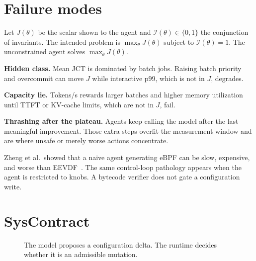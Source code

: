 \documentclass{article}
\begin{document}
\section{Failure modes}

Let $J(\theta)$ be the scalar shown to the agent and $\mathcal{I}(\theta)\in\{0,1\}$ the conjunction of invariants.
The intended problem is $\max_\theta J(\theta)$ subject to $\mathcal{I}(\theta)=1$.
The unconstrained agent solves $\max_\theta J(\theta)$.

\textbf{Hidden class.}
Mean JCT is dominated by batch jobs.
Raising batch priority and overcommit can move $J$ while interactive p99, which is not in $J$, degrades.

\textbf{Capacity lie.}
Tokens/s rewards larger batches and higher memory utilization until TTFT or KV-cache limits, which are not in $J$, fail.

\textbf{Thrashing after the plateau.}
Agents keep calling the model after the last meaningful improvement.
Those extra steps overfit the measurement window and are where unsafe or merely worse actions concentrate.

Zheng et al.\ showed that a naive agent generating eBPF can be slow, expensive, and worse than EEVDF~\cite{zheng2025schedcp}.
The same control-loop pathology appears when the agent is restricted to knobs.
A bytecode verifier does not gate a configuration write.

\section{SysContract}

\begin{figure}[ht]
\centering
{}
\caption{The model proposes a configuration delta. The runtime decides whether it is an admissible mutation.}
\label{fig:arch}
\end{figure}
\end{document}
